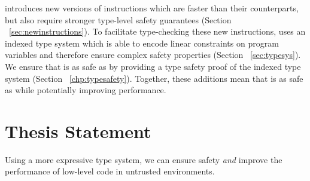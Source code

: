 \name introduces new versions of \wasm instructions which are faster than their \wasm counterparts, but also require stronger type-level safety guarantees (Section ~\ref{sec:newinstructions}).
To facilitate type-checking these new instructions, \name uses an indexed type system which is able to encode linear constraints on program variables and therefore ensure complex safety properties (Section ~\ref{sec:typesys}).
We ensure that \name is as safe as \wasm by providing a type safety proof of the \name indexed type system (Section ~\ref{chp:typesafety}).
Together, these additions mean that \name is as safe as \wasm while potentially improving performance.

\section{Thesis Statement}
\begin{adjustwidth}{1cm}{1cm}
    Using a more expressive type system, we can ensure safety \emph{and} improve the performance of low-level code in untrusted environments.
\end{adjustwidth}
